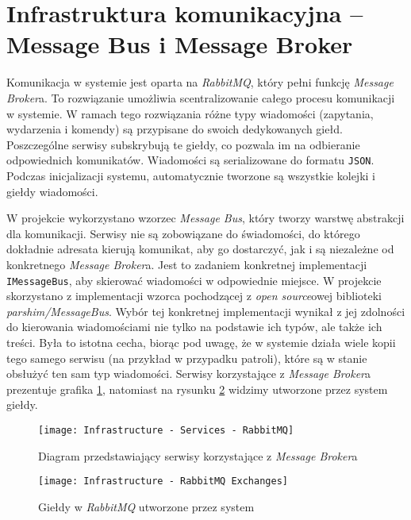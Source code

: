\section{Infrastruktura komunikacyjna -- Message Bus i Message Broker}
\label{sec:infrastrukturaKomunikacyjna}

\par Komunikacja w systemie jest oparta na \emph{RabbitMQ}, który pełni funkcję \emph{Message Broker}a. To rozwiązanie umożliwia scentralizowanie całego procesu komunikacji w systemie. W ramach tego rozwiązania różne typy wiadomości (zapytania, wydarzenia i komendy) są przypisane do swoich dedykowanych giełd. Poszczególne serwisy subskrybują te giełdy, co pozwala im na odbieranie odpowiednich komunikatów. Wiadomości są serializowane do formatu \texttt{JSON}. Podczas inicjalizacji systemu, automatycznie tworzone są wszystkie kolejki i giełdy wiadomości.

\par W projekcie wykorzystano wzorzec \emph{Message Bus}, który tworzy warstwę abstrakcji dla komunikacji. Serwisy nie są zobowiązane do świadomości, do którego dokładnie adresata kierują komunikat, aby go dostarczyć, jak i są niezależne od konkretnego \emph{Message Broker}a. Jest to zadaniem konkretnej implementacji \texttt{IMessageBus}, aby skierować wiadomości w odpowiednie miejsce. W projekcie skorzystano z implementacji wzorca pochodzącej z \emph{open source}owej biblioteki \emph{parshim/MessageBus}\cite{PARSHIM_MESSAGEBUS_GITHUB}. Wybór tej konkretnej implementacji wynikał z jej zdolności do kierowania wiadomościami nie tylko na podstawie ich typów, ale także ich treści. Była to istotna cecha, biorąc pod uwagę, że w systemie działa wiele kopii tego samego serwisu (na przykład w przypadku patroli), które są w stanie obsłużyć ten sam typ wiadomości. Serwisy korzystające z \emph{Message Broker}a prezentuje grafika \ref{fig:infrastructureServicesRabbitMq}, natomiast na rysunku \ref{fig:infrastructureRabbitMqExchanges} widzimy utworzone przez system giełdy.

\begin{figure}
    \centering
    \texttt{[image: Infrastructure - Services - RabbitMQ]}
    \caption{Diagram przedstawiający serwisy korzystające z \emph{Message Broker}a}
    \label{fig:infrastructureServicesRabbitMq}
\end{figure}

\begin{figure}
    \centering
    \texttt{[image: Infrastructure - RabbitMQ Exchanges]}
    \caption{Giełdy w \emph{RabbitMQ} utworzone przez system}
    \label{fig:infrastructureRabbitMqExchanges}
\end{figure}

